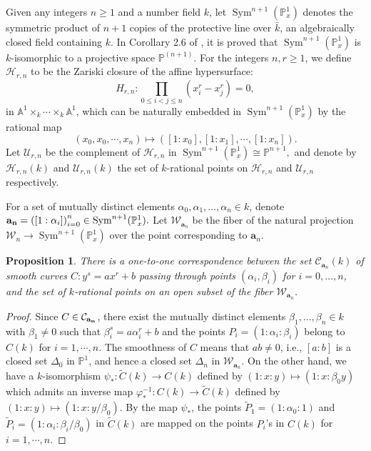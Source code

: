 \documentclass[11pt, a4paper]{amsart}
\newtheorem{prop}[thm]{Proposition}
\theoremstyle{definition}
\newcommand{\Pp}{\mathbb{P}}
\newcommand{\Aa}{\mathbb{A}}
\newcommand{\kk}{\bar{k}}
\newcommand{\Cc}{\mathcal{C}}
\newcommand{\Hc}{\mathcal{H}}
\newcommand{\Uc}{\mathcal{U}}
\newcommand{\Wc}{\mathcal{W}}
\newcommand{\ba}{\mathbf{a}}
\DeclareMathOperator{\Sym}{Sym}
\begin{document}
Given any  integers $n\geq 1$ and a number field  $k$, let  
$\Sym^{n+1}(\Pp^1_x) $  denotes the 
symmetric product of $n+1$ copies of the protective line over   $\kk$, an algebraically closed field containing $k$.  In  Corollary 2.6 of \cite{Maakestad2005},  it is proved that $\Sym^{n+1}(\Pp^1_x)$ is $k$-isomorphic to a projective space $\Pp^{(n+1)}$.
For  the integers $n, r \geq 1$, we define  $\Hc_{r,n}$ to be the Zariski closure of the affine hypersurface: 
$$ H_{r, n}: \prod_{0\leq i < j\leq n}^{} (x_i^r-x_j^r) =0,$$
in $\Aa^1 \times_k \cdots \times_k \Aa^1 $,
which can be naturally embedded in $\Sym^{n+1}(\Pp^1_x)$ by the rational map
$$(x_0, x_0,\cdots, x_n)\mapsto  \left( [1:x_0], [1:x_1],\cdots, [1:x_n]\right).$$
Let  $\Uc_{r,n}$  be the  complement of   $\Hc_{r,n}$ in
$\Sym^{n+1}(\Pp^1_x) \cong \Pp^{n+1},$ and 
denote by  $\Hc_{r, n}(k)$ and $\Uc_{r,n} (k)$ the set of $k$-rational points  on 
$\Hc_{r,n}$ and $\Uc_{r, n} $ respectively.

For a   set of mutually distinct elements $\alpha_0,  \alpha_1, \ldots, \alpha_n \in k$,
denote ${\bf a_n}=\left([1:\alpha_i]   \right)_{i=0}^n \in \Sym^{n+1}(\Pp^1_x).$
Let $\Wc_{\ba_n}$ be the fiber of the natural projection $\Wc_n \to \Sym^{n+1}(\Pp^1_x)$ over the point corresponding to $\ba_n$.

\begin{prop}
	\label{pr1}
	There is a one-to-one correspondence between the set $\Cc_{\ba_n}(k)$ of smooth curves $C: y^s = ax^r+b$ passing through points $( \alpha_i, \beta_i)$ for $i=0,\dots,n$, and the set of $k$-rational points on an open subset of the fiber $\Wc_{\ba_n}$.
\end{prop}
\begin{proof}
	Since $C\in \Cc_{\bf a_n}$,   there exist the mutually distinct elements $\beta_1,\ldots, \beta_n \in k$ with $\beta_1\neq 0$   such that  $\beta_i^s=a \alpha_i^r +b$ and   the points 
	$P_i=(1:\alpha_i:\beta_i)$ belong to $C(k)$ for  $i=1,\cdots, n$. 
	The smoothness of $C$ means that $a b\neq 0$, i.e., $[a:b] $ is a closed set $\Delta_0$ in $\Pp^1$, and hence a closed set $\Delta_n$ in  $\Wc_{\ba_n}$.
	On the other hand, 	we have  a $k$-isomorphism 
	$\psi_*: \tilde{C}(k) \rightarrow  C(k)$ defined  by
	$(1:x:y) \mapsto (1:x: \beta_0 y)$ which admits an inverse     map
	$\varphi_*^{-1}: C(k) \rightarrow  \tilde{C}(k)$ defined by
	$(1:x:y) \mapsto (1:x: y/\beta_0)$.
	By the map $\psi_*$, the points $\tilde{P}_1=(1:\alpha_0: 1)$ and 
	$\tilde{P}_i=(1:\alpha_i:\beta_i/\beta_0)$ in $\tilde{C}(k)$
	are mapped on the points $P_i$'s in  $C(k)$ for $i=1,\cdots, n$.			
\end{proof}
\end{document}
